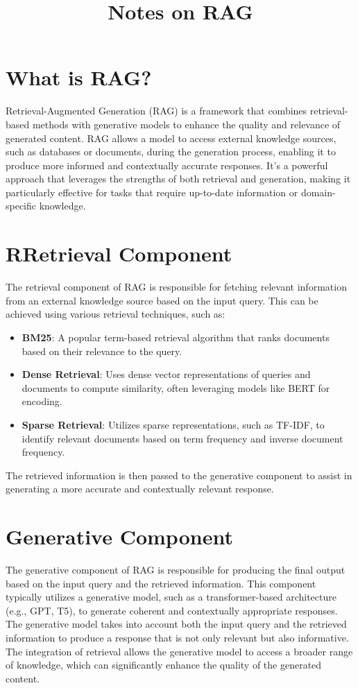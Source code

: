 \documentclass[conference]{IEEEtran}
\title{Notes on RAG }
\author{
\IEEEauthorblockN{Luis Mendez}
}
\begin{document}
\maketitle

\section{What is RAG?}
Retrieval-Augmented Generation (RAG) is a framework that combines retrieval-based methods with generative models to enhance the quality and relevance of generated content. RAG allows a model to access external knowledge sources, such as databases or documents, during the generation process, enabling it to produce more informed and contextually accurate responses.
It's a powerful approach that leverages the strengths of both retrieval and generation, making it particularly effective for tasks that require up-to-date information or domain-specific knowledge.

\section{RRetrieval Component}
The retrieval component of RAG is responsible for fetching relevant information from an external knowledge source based on the input query. This can be achieved using various retrieval techniques, such as:
\begin{itemize}
    \item \textbf{BM25}: A popular term-based retrieval algorithm that ranks documents based on their relevance to the query.
    \item \textbf{Dense Retrieval}: Uses dense vector representations of queries and documents to compute similarity, often leveraging models like BERT for encoding.
    \item \textbf{Sparse Retrieval}: Utilizes sparse representations, such as TF-IDF, to identify relevant documents based on term frequency and inverse document frequency.
\end{itemize}
The retrieved information is then passed to the generative component to assist in generating a more accurate and
contextually relevant response.
\section{Generative Component}
The generative component of RAG is responsible for producing the final output based on the input query
and the retrieved information. This component typically utilizes a generative model, such as a transformer-based architecture (e.g., GPT, T5), to generate coherent and contextually appropriate responses.
The generative model takes into account both the input query and the retrieved information to produce a response that is not only relevant but also informative. The integration of retrieval allows the generative model to access a broader range of knowledge, which can significantly enhance the quality of the generated content.
\end{document}
